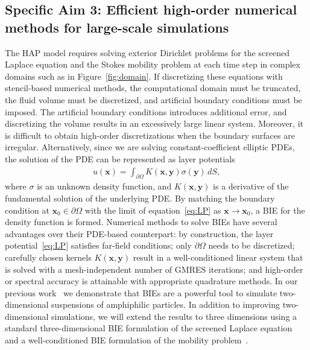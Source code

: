 
\subsection{Specific Aim 3: Efficient high-order numerical methods for
large-scale simulations}
\label{subsec:specific_aim_3}
The HAP model requires solving exterior Dirichlet problems for the
screened Laplace equation and the Stokes mobility problem at each time
step in complex domains such as in Figure~\ref{fig:domain}. If
discretizing these equations with stencil-based numerical methods, the
computational domain must be truncated, the fluid volume must be
discretized, and artificial boundary conditions must be imposed. The
artificial boundary conditions introduces additional error, and
discretizing the volume results in an excessively large linear system.
Moreover, it is difficult to obtain high-order discretizations when the
boundary surfaces are irregular. Alternatively, since we are solving
constant-coefficient elliptic PDEs, the solution of the PDE can be
represented as layer potentials
\begin{align}
  \label{eq:LP}
  u(\mathbf{x}) = \int_{\partial\Omega} K(\mathbf{x},\mathbf{y})
  \sigma(\mathbf{y})\,dS,
\end{align}
where $\sigma$ is an unknown density function, and
$K(\mathbf{x},\mathbf{y})$ is a derivative of the fundamental solution
of the underlying PDE. By matching the boundary condition at
$\mathbf{x}_0 \in \partial\Omega$ with the limit of
equation~\eqref{eq:LP} as $\mathbf{x}\rightarrow \mathbf{x}_0$, a BIE
for the density function is formed. Numerical methods to solve BIEs have
several advantages over their PDE-based counterpart: by construction,
the layer potential~\eqref{eq:LP} satisfies far-field conditions; only
$\partial\Omega$ needs to be discretized; carefully chosen kernels
$K(\mathbf{x},\mathbf{y})$ result in a well-conditioned linear system
that is solved with a mesh-independent number of GMRES iterations; and
high-order or spectral accuracy is attainable with appropriate
quadrature methods. In our previous work~\cite{Fu2018_SIAM} we
demonstrate that BIEs are a powerful tool to simulate two-dimensional
suspensions of amphiphilic particles. In addition to improving
two-dimensional simulations, we will extend the results to three
dimensions using a standard three-dimensional BIE formulation of the
screened Laplace equation~\cite{ying_2006} and a well-conditioned BIE
formulation of the mobility problem~\cite{manasthesis, rac-gre2016}.

